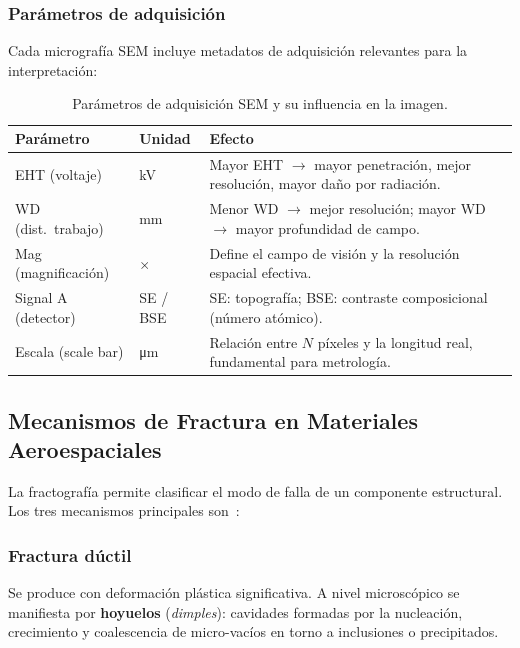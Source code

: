\documentclass[12pt,a4paper]{article}
\begin{document}
\subsubsection{Parámetros de adquisición}

Cada micrografía SEM incluye metadatos de adquisición relevantes para la
interpretación:

\begin{table}[H]
	\centering
	\caption{Parámetros de adquisición SEM y su influencia en la imagen.}
	\label{tab:parametros_sem}
	\begin{tabularx}{\textwidth}{l l X}
		\toprule
		\textbf{Parámetro}  & \textbf{Unidad} & \textbf{Efecto}            \\
		\midrule
		EHT (voltaje)       & \si{\kilo\volt} & Mayor EHT $\to$ mayor
		penetración, mejor resolución, mayor daño por radiación.           \\
		WD (dist.\ trabajo) & \si{\mm}        & Menor WD $\to$ mejor
		resolución; mayor WD $\to$ mayor profundidad de campo.             \\
		Mag (magnificación) & $\times$        & Define el campo de visión
		y la resolución espacial efectiva.                                 \\
		Signal A (detector) & SE / BSE        & SE: topografía; BSE:
		contraste composicional (número atómico).                          \\
		Escala (scale bar)  & \si{\micro\m}   & Relación entre $N$ píxeles
		y la longitud real, fundamental para metrología.                   \\
		\bottomrule
	\end{tabularx}
\end{table}

\subsection{Mecanismos de Fractura en Materiales Aeroespaciales}

La fractografía permite clasificar el modo de falla de un componente
estructural.  Los tres mecanismos principales son~\cite{asm_fractography,
	anderson2017,dowling2013}:

\subsubsection{Fractura dúctil}

Se produce con deformación plástica significativa.  A nivel microscópico se
manifiesta por \textbf{hoyuelos} (\emph{dimples}): cavidades formadas por
la nucleación, crecimiento y coalescencia de micro-vacíos en torno a
inclusiones o precipitados.
\end{document}
